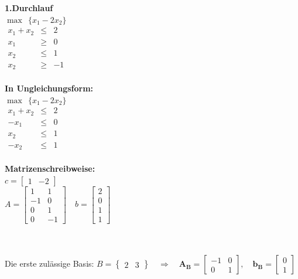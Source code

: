 \begin{minipage}[t]{0.66\textwidth}
	\begin{minipage}[t]{0.3\linewidth}
		\textbf{1.Durchlauf} \\
		$\max~~\{x_1-2x_2\}$\\
		$\begin{array}{ccc}
			x_1+x_2 & \leq & 2\\
			x_1 & \geq & 0\\
			x_2 & \leq & 1\\
			x_2 & \geq & -1\\
			
			
		\end{array}$
	\end{minipage}
	\hfill
	\begin{minipage}[t]{0.34\linewidth}
		\textbf{In Ungleichungsform:} \\
		$\max~~\{x_1-2x_2\}$\\
		$\begin{array}{ccc}
			x_1+x_2 & \leq & 2\\
			-x_1 & \leq & 0\\
			x_2 & \leq & 1\\
			-x_2 & \leq & 1\\
			
		\end{array}$
	\end{minipage}
	\hfill
	\begin{minipage}[t]{0.34\linewidth}
	\textbf{Matrizenschreibweise:}\\
	$c=\begin{bmatrix}
	1&-2
	\end{bmatrix}$\\
	$A=\begin{bmatrix}
	1  &  1 \\
	-1 &  0 \\
	 0 &  1 \\
	 0 & -1 
	\end{bmatrix}\quad 
	b=\begin{bmatrix}
	2\\
	0\\
	1\\
	1
	\end{bmatrix}$
	\end{minipage}\\
	\\
	
Die erste zulässige Basis: $B=\begin{Bmatrix}2&3\end{Bmatrix}\quad\Rightarrow\quad \mathbf{A_B}=\begin{bmatrix}-1&0\\0&1\end{bmatrix},\quad \mathbf{b_B}=\begin{bmatrix}0\\1\end{bmatrix}$


\end{minipage}
